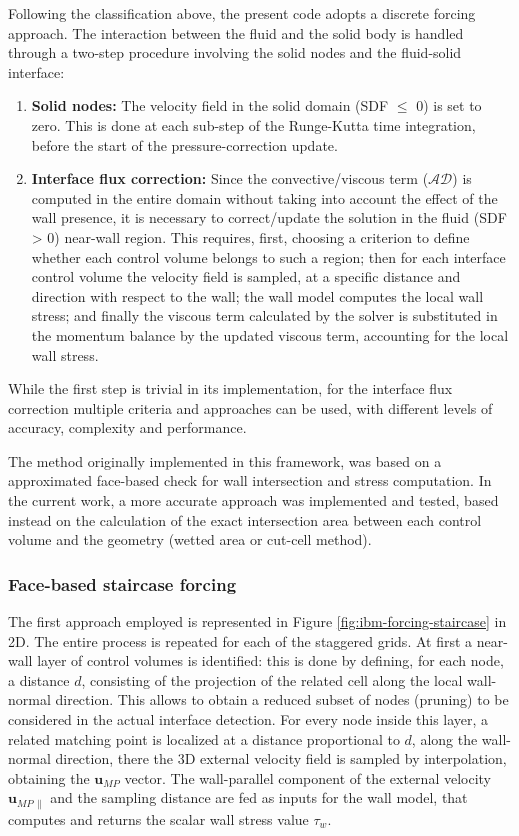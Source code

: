 \documentclass[12pt, a4paper, twoside, openright]{book}
\begin{document}
Following the classification above, the present code adopts a discrete forcing approach. The interaction between the fluid and the solid body is handled through a two-step procedure involving the solid nodes and the fluid-solid interface:
\begin{enumerate}
	\item \textbf{Solid nodes:} The velocity field in the solid domain (SDF $\leq$ 0) is set to zero. This is done at each sub-step of the Runge-Kutta time integration, before the start of the pressure-correction update.
	\item \textbf{Interface flux correction:} Since the convective/viscous term ($\mathcal{AD}$) is computed in the entire domain without taking into account the effect of the wall presence, it is necessary to correct/update the solution in the fluid (SDF > 0) near-wall region. This requires, first, choosing a criterion to define whether each control volume belongs to such a region; then for each interface control volume the velocity field is sampled, at a specific distance and direction with respect to the wall; the wall model computes the local wall stress; and finally the viscous term calculated by the solver is substituted in the momentum balance by the updated viscous term, accounting for the local wall stress.
\end{enumerate}

While the first step is trivial in its implementation, for the interface flux correction multiple criteria and approaches can be used, with different levels of accuracy, complexity and performance. 

The method originally implemented in this framework, was based on a approximated face-based check for wall intersection and stress computation. In the current work, a more accurate approach was implemented and tested, based instead on the calculation of the exact intersection area between each control volume and the geometry (wetted area or cut-cell method).

\subsubsection{Face-based staircase forcing}
The first approach employed is represented in Figure \ref{fig:ibm-forcing-staircase} in 2D. The entire process is repeated for each of the staggered grids. At first a near-wall layer of control volumes is identified: this is done by defining, for each node, a distance $d$, consisting of the projection of the related cell along the local wall-normal direction. This allows to obtain a reduced subset of nodes (pruning) to be considered in the actual interface detection. For every node inside this layer, a related matching point is localized at a distance proportional to $d$, along the wall-normal direction, there the 3D external velocity field is sampled by interpolation, obtaining the $\bm{u}_{MP}$ vector. The wall-parallel component of the external velocity $\bm{u}_{MP \, \parallel}$ and the sampling distance are fed as inputs for the wall model, that computes and returns the scalar wall stress value $\tau_w$.
\end{document}
